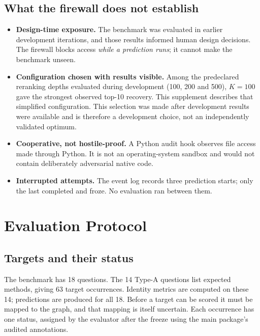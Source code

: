 \documentclass[11pt,a4paper]{article}
\theoremstyle{remark}
\begin{document}
\subsection{What the firewall does not establish}

\begin{cautionbox}
\begin{itemize}[leftmargin=*]
  \item \textbf{Design-time exposure.} The benchmark was evaluated in earlier development
        iterations, and those results informed human design decisions. The firewall blocks
        access \emph{while a prediction runs}; it cannot make the benchmark unseen.
  \item \textbf{Configuration chosen with results visible.} Among the predeclared
        reranking depths evaluated during development (100, 200 and 500), $K=100$ gave
        the strongest observed top-10 recovery. This supplement describes that simplified
        configuration. This selection was made after development results were available
        and is therefore a development choice, not an independently validated optimum.
  \item \textbf{Cooperative, not hostile-proof.} A Python audit hook observes file access
        made through Python. It is not an operating-system sandbox and would not contain
        deliberately adversarial native code.
  \item \textbf{Interrupted attempts.} The event log records three prediction starts; only
        the last completed and froze. No evaluation ran between them.
\end{itemize}
\end{cautionbox}

\section{Evaluation Protocol}
\label{sec:protocol}

\subsection{Targets and their status}

The benchmark has 18 questions. The 14 Type-A questions list expected methods, giving 63
target occurrences. Identity metrics are computed on these 14; predictions are produced
for all 18. Before a target can be scored it must be mapped to the graph, and that mapping
is itself uncertain. Each occurrence has one status, assigned by the evaluator after the
freeze using the main package's audited annotations.
\end{document}
